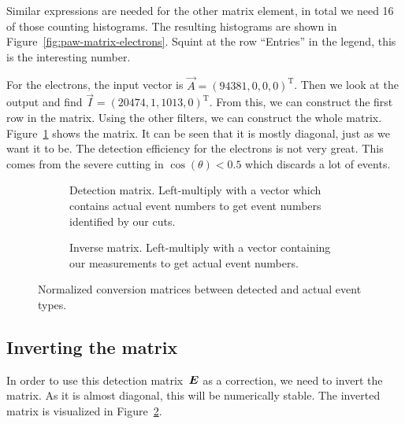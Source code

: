 \documentclass[11pt, english, fleqn, DIV=15, headinclude, BCOR=2cm]{scrreprt}
\begin{document}
Similar expressions are needed for the other matrix element, in total we need
16 of those counting histograms. The resulting histograms are shown in
Figure~\ref{fig:paw-matrix-electrons}. Squint at the row \enquote{Entries} in
the legend, this is the interesting number.

For the electrons, the input vector is $\vec A = (94381, 0, 0,
0)^\mathrm T$. Then we look at the output and find $\vec I = (20474, 1, 1013,
0)^\mathrm T$. From this, we can construct the first row in the matrix. Using
the other filters, we can construct the whole matrix. Figure~\ref{fig:matrix/1}
shows the matrix. It can be seen that it is mostly diagonal, just as we want it
to be. The detection efficiency for the electrons is not very great. This comes
from the severe cutting in $\cos(\theta) < 0.5$ which discards a lot of events.


\begin{figure}
    \centering
    \begin{subfigure}[t]{0.48\linewidth}
        \centering
        \caption{%
            Detection matrix. Left-multiply with a vector which contains actual
            event numbers to get event numbers identified by our cuts.
        }
        \label{fig:matrix/1}
    \end{subfigure}
    \hfill
    \begin{subfigure}[t]{0.48\linewidth}
        \centering
        \caption{%
            Inverse matrix. Left-multiply with a vector containing our
            measurements to get actual event numbers.
        }
        \label{fig:matrix/2}
    \end{subfigure}
    \caption{%
        Normalized conversion matrices between detected and actual event types.
    }
    \label{fig:matrix}
\end{figure}

\subsection{Inverting the matrix}

In order to use this detection matrix~$\mat E$ as a correction, we need to
invert the matrix. As it is almost diagonal, this will be numerically stable.
The inverted matrix is visualized in Figure~\ref{fig:matrix/2}.

\end{document}
